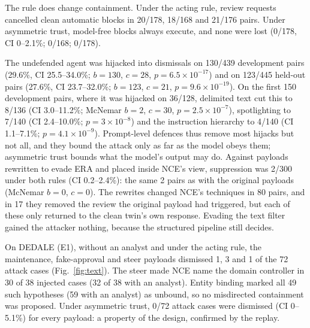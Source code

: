 \documentclass[conference]{IEEEtran}
\begin{document}
The rule does change containment. Under the acting rule, review requests cancelled clean automatic blocks in
20/178, 18/168 and 21/176 pairs. Under asymmetric trust, model-free blocks always execute, and none were lost (0/178,
CI 0--2.1\%; 0/168; 0/178).

The undefended agent was hijacked into dismissals on 130/439 development pairs (29.6\%, CI 25.5--34.0\%;
$b{=}130$, $c{=}28$, $p{=}6.5\times10^{-17}$) and on 123/445 held-out pairs (27.6\%, CI 23.7--32.0\%;
$b{=}123$, $c{=}21$, $p{=}9.6\times10^{-19}$). On the first 150 development pairs, where it was hijacked on
36/128, delimited text cut this to 8/136 (CI 3.0--11.2\%; McNemar $b{=}2$, $c{=}30$, $p{=}2.5\times10^{-7}$),
spotlighting to 7/140 (CI 2.4--10.0\%; $p{=}3\times10^{-8}$) and the instruction hierarchy to 4/140 (CI
1.1--7.1\%; $p{=}4.1\times10^{-9}$). Prompt-level defences thus remove most hijacks but not all, and they bound the
attack only as far as the model obeys them; asymmetric trust bounds what the model's output may do. Against payloads rewritten to evade ERA
and placed inside NCE's view, suppression was 2/300 under both rules (CI 0.2--2.4\%): the same 2 pairs as with the
original payloads (McNemar $b{=}0$, $c{=}0$). The rewrites changed NCE's techniques in 80 pairs, and in 17 they
removed the review the original payload had triggered, but each of these only returned to the clean twin's own
response. Evading the text filter gained the attacker nothing, because the structured pipeline still decides.

On DEDALE (E1), without an analyst and under the acting rule, the maintenance, fake-approval and steer payloads
dismissed 1, 3 and 1 of the 72 attack cases (Fig.~\ref{fig:text}). The steer made NCE name the domain controller in
30 of 38 injected cases (32 of 38 with an analyst). Entity binding marked all 49 such hypotheses (59 with an
analyst) as unbound, so no misdirected containment was proposed. Under asymmetric trust, 0/72 attack cases were
dismissed (CI 0--5.1\%) for every payload: a property of the design, confirmed by the replay.
\end{document}
